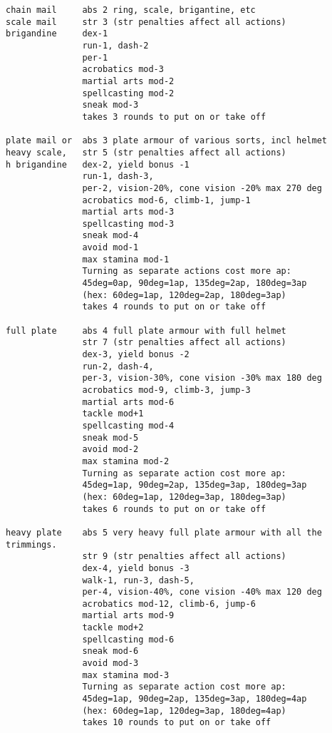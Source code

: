\begin{verbatim}
chain mail     abs 2 ring, scale, brigantine, etc
scale mail     str 3 (str penalties affect all actions)
brigandine     dex-1
               run-1, dash-2
               per-1
               acrobatics mod-3
               martial arts mod-2
               spellcasting mod-2
               sneak mod-3
               takes 3 rounds to put on or take off

plate mail or  abs 3 plate armour of various sorts, incl helmet
heavy scale,   str 5 (str penalties affect all actions)
h brigandine   dex-2, yield bonus -1
               run-1, dash-3,
               per-2, vision-20%, cone vision -20% max 270 deg
               acrobatics mod-6, climb-1, jump-1
               martial arts mod-3
               spellcasting mod-3
               sneak mod-4
               avoid mod-1
               max stamina mod-1
               Turning as separate actions cost more ap:
               45deg=0ap, 90deg=1ap, 135deg=2ap, 180deg=3ap
               (hex: 60deg=1ap, 120deg=2ap, 180deg=3ap)
               takes 4 rounds to put on or take off

full plate     abs 4 full plate armour with full helmet
               str 7 (str penalties affect all actions)
               dex-3, yield bonus -2
               run-2, dash-4,
               per-3, vision-30%, cone vision -30% max 180 deg
               acrobatics mod-9, climb-3, jump-3
               martial arts mod-6
               tackle mod+1
               spellcasting mod-4
               sneak mod-5
               avoid mod-2
               max stamina mod-2
               Turning as separate action cost more ap:
               45deg=1ap, 90deg=2ap, 135deg=3ap, 180deg=3ap
               (hex: 60deg=1ap, 120deg=3ap, 180deg=3ap)
               takes 6 rounds to put on or take off

heavy plate    abs 5 very heavy full plate armour with all the trimmings.
               str 9 (str penalties affect all actions)
               dex-4, yield bonus -3
               walk-1, run-3, dash-5,
               per-4, vision-40%, cone vision -40% max 120 deg
               acrobatics mod-12, climb-6, jump-6
               martial arts mod-9
               tackle mod+2
               spellcasting mod-6
               sneak mod-6
               avoid mod-3
               max stamina mod-3
               Turning as separate action cost more ap:
               45deg=1ap, 90deg=2ap, 135deg=3ap, 180deg=4ap
               (hex: 60deg=1ap, 120deg=3ap, 180deg=4ap)
               takes 10 rounds to put on or take off

\end{verbatim}
\normalsize



